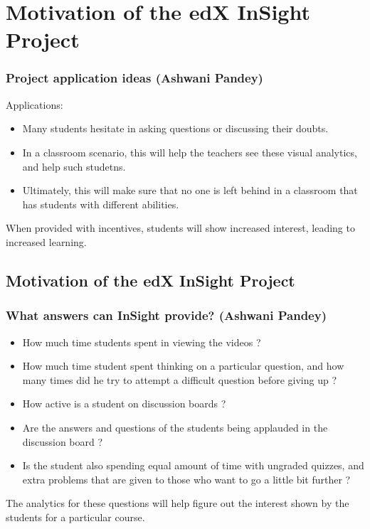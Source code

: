 \documentclass[12pt,xcolor=dvipsnames]{beamer}
\begin{document}
\section{Motivation of the edX InSight Project}
\begin{frame}[t]
\frametitle{Project application ideas (Ashwani Pandey)}

Applications:
\begin{itemize}
\item Many students hesitate in asking questions or discussing their doubts.
\item In a classroom scenario, this will help the teachers see these visual analytics, and help such studetns.
\item Ultimately, this will make sure that no one is left behind in a classroom that has students with different abilities.

\end{itemize}

When provided with incentives, students will show increased interest, leading to increased learning.

\end{frame}


\subsection{Motivation of the edX InSight Project}
\begin{frame}[t]
\frametitle{What answers can InSight provide? (Ashwani Pandey)}

\begin{itemize}

\item How much time students spent in viewing the videos ?
\item How much time student spent thinking on a particular question, and how many times did he try to attempt a difficult question before giving up ?
\item How active is a student on discussion boards ?
\item Are the answers and questions of the students being applauded in the discussion board ?
\item Is the student also spending equal amount of time with ungraded quizzes, and extra problems that are given to those who want to go a little bit further ?

\end{itemize}

The analytics for these questions will help figure out the interest shown by the students for a particular course.

\end{frame}
\end{document}
